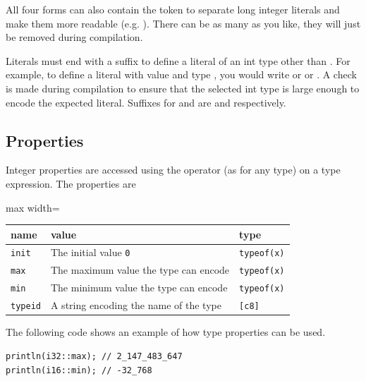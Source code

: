 All four forms can also contain the token \token{\_} to separate long integer
literals and make them more readable (e.g. ).
There can be as many \token{\_} as you like, they will just be removed during
compilation.

Literals must end with a suffix to define a literal of an int type other than
. For example, to define a literal with value  and type
, you would write  or  or
. A check is made during compilation to ensure that the selected
int type is large enough to encode the expected literal. Suffixes for
 and  are  and  respectively.

\subsection{Properties}
\label{sec:orgc02cb40}

Integer properties are accessed using the \token{::} operator (as for any type)
on a type expression. The properties are

\begin{center}
  \begin{adjustbox}{max width=\linewidth}
    \begin{tabular}{|l|ll|}
      \hline
      name & value & type\\[0pt]
      \hline
      \hline
      \texttt{init} & The initial value \texttt{0} & \texttt{typeof(x)}\\[0pt]
      \texttt{max} & The maximum value the type can encode & \texttt{typeof(x)}\\[0pt]
      \texttt{min} & The minimum value the type can encode & \texttt{typeof(x)}\\[0pt]
      \hline
      \texttt{typeid} & A string encoding the name of the type & \texttt{[c8]}\\[0pt]
      \hline
    \end{tabular}
  \end{adjustbox}
\end{center}



The following code shows an example of how type properties can be used.

\begin{lstlisting}[style=coloredverbatim]
println(i32::max); // 2_147_483_647
println(i16::min); // -32_768
\end{lstlisting}

